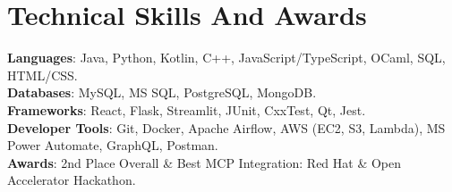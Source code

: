 \documentclass[letterpaper,11pt]{article}
\begin{document}
\section{Technical Skills And Awards}
 \begin{itemize}[leftmargin=0.15in, label={}]
    \small{\item{
     \textbf{Languages}{: Java, Python, Kotlin, C++, JavaScript/TypeScript, OCaml, SQL, HTML/CSS.} \\
     \textbf{Databases}{: MySQL, MS SQL, PostgreSQL, MongoDB.} \\
     \textbf{Frameworks}{: React, Flask, Streamlit, JUnit, CxxTest, Qt, Jest.} \\
    \textbf{Developer Tools}{: Git, Docker, Apache Airflow, AWS (EC2, S3, Lambda), MS Power Automate, GraphQL, Postman.} \\
    \textbf{Awards}{: 2nd Place Overall \& Best MCP Integration: Red Hat \& Open Accelerator Hackathon.}
    }}
 \end{itemize}
\end{document}
